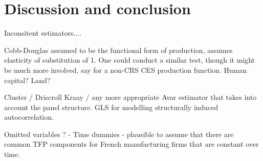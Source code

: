 \section{Discussion and conclusion}

Inconsitent estimators.... 

Cobb-Douglas assumed to be the functional form of production, assumes elasticity of substitution of 1. One could conduct a similar test, though it might be much more involved, say for a non-CRS CES production function. Human capital? Land? 

Cluster / Driscroll Kraay / any more appropriate Avar estimator that takes into account the panel structure. GLS for modelling structurally induced autocorrelation.  

Omitted variables ? - Time dummies -\> plausible to assume that there are common TFP components for French manufacturing firms that are constant over time.
